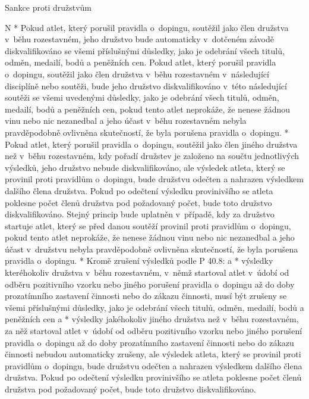 \secc Sankce proti družstvům

\begitems \style N
* Pokud atlet, který porušil pravidla o~dopingu, soutěžil jako člen družstva v~běhu rozestavném, jeho družstvo bude automaticky v~dotčeném závodě diskvalifikováno se všemi příslušnými důsledky, jako je odebrání všech titulů, odměn, medailí, bodů a peněžních cen.  Pokud atlet, který porušil pravidla o~dopingu, soutěžil jako člen družstva v~běhu rozestavném v~následující disciplíně nebo soutěži, bude jeho družstvo diskvalifikováno v~této následující soutěži se všemi uvedenými důsledky, jako je odebrání všech titulů, odměn, medailí, bodů a peněžních cen, pokud tento atlet neprokáže, že nenese žádnou vinu nebo nic nezanedbal a jeho účast v~běhu rozestavném nebyla pravděpodobně ovlivněna skutečností, že byla porušena pravidla o~dopingu.
* Pokud atlet, který porušil pravidla o~dopingu, soutěžil jako člen jiného družstva než v~běhu rozestavném, kdy pořadí družstev je založeno na součtu jednotlivých výsledků, jeho družstvo nebude diskvalifikováno, ale výsledek atleta, který se provinil proti pravidlům o~dopingu, bude družstvu odečten a nahrazen výsledkem dalšího člena družstva. Pokud po odečtení výsledku provinivšího se atleta poklesne počet členů družstva pod požadovaný počet, bude toto družstvo diskvalifikováno. Stejný princip bude uplatněn v~případě, kdy za družstvo startuje atlet, který se před danou soutěží provinil proti pravidlům o~dopingu, pokud tento atlet neprokáže, že nenese žádnou vinu nebo nic nezanedbal a jeho účast v~družstvu nebyla pravděpodobně ovlivněna skutečností, že byla porušena pravidla o~dopingu.
* Kromě zrušení výsledků podle P 40.8:
  \begitems \style a
  * výsledky kteréhokoliv družstva v~běhu rozestavném, v~němž startoval atlet v~údobí od odběru pozitivního vzorku nebo jiného porušení pravidla o~dopingu až do doby prozatímního zastavení činnosti nebo do zákazu činnosti, musí být zrušeny se všemi příslušnými důsledky, jako je odebrání všech titulů, odměn, medailí, bodů a peněžních cen a
  * výsledky jakéhokoliv jiného družstva než v~běhu rozestavném, za něž startoval atlet v~údobí od odběru pozitivního vzorku nebo jiného porušení pravidla o~dopingu až do doby prozatímního zastavení činnosti nebo do zákazu činnosti nebudou automaticky zrušeny, ale výsledek atleta, který se provinil proti pravidlům o~dopingu, bude družstvu odečten a nahrazen výsledkem dalšího člena družstva. Pokud po odečtení výsledku provinivšího se atleta poklesne počet členů družstva pod požadovaný počet, bude toto družstvo diskvalifikováno.
  \enditems
\enditems


